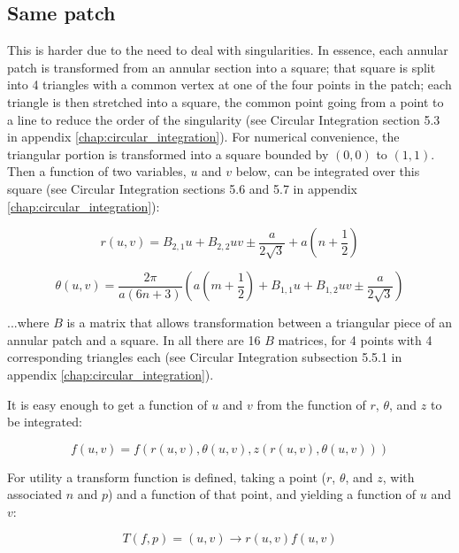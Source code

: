 \documentclass[etd,senior,noacknowledgments]{BYUPhys}
\begin{document}
\subsection{Same patch} \label{sec:same_patch}

This is harder due to the need to deal with singularities. In essence, each annular patch is transformed from an annular section into a square; that square is split into 4 triangles with a common vertex at one of the four points in the patch; each triangle is then stretched into a square, the common point going from a point to a line to reduce the order of the singularity (see Circular Integration section 5.3 in appendix \ref{chap:circular_integration}). For numerical convenience, the triangular portion is transformed into a square bounded by $(0,0)$ to $(1,1)$. Then a function of two variables, $u$ and $v$ below, can be integrated over this square (see Circular Integration sections 5.6 and 5.7 in appendix \ref{chap:circular_integration}):

\begin{equation}
  r\left(u,v\right)=B_{2,1}u+B_{2,2}uv\pm\frac{a}{2\sqrt{3}}+a\left(n+\frac{1}{2}\right)
\end{equation}

\begin{equation}
  \theta\left(u,v\right)=\frac{2\pi}{a(6n+3)}\left(a\left(m+\frac{1}{2}\right)+B_{1,1}u+B_{1,2}uv\pm\frac{a}{2\sqrt{3}}\right)
\end{equation}

...where $B$ is a matrix that allows transformation between a triangular piece of an annular patch and a square. In all there are 16 $B$ matrices, for 4 points with 4 corresponding triangles each (see Circular Integration subsection 5.5.1 in appendix \ref{chap:circular_integration}).

It is easy enough to get a function of $u$ and $v$ from the function of $r$, $\theta$, and $z$ to be integrated:

\begin{equation}
  f\left(u,v\right)=f\left(r\left(u,v\right),\theta\left(u,v\right),z\left(r\left(u,v\right),\theta\left(u,v\right)\right)\right)
\end{equation}

For utility a transform function is defined, taking a point ($r$, $\theta$, and $z$, with associated $n$ and $p$) and a function of that point, and yielding a function of $u$ and $v$:

\begin{equation}
  T\left(f,p\right)=\left(u,v\right)\rightarrow r\left(u,v\right)f\left(u,v\right)
\end{equation}
\end{document}
